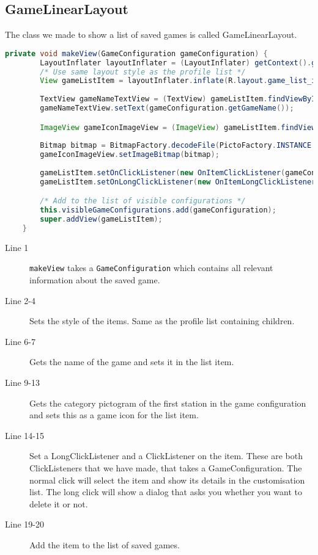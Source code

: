 \subsection*{GameLinearLayout}
The class we made to show a list of saved games is called GameLinearLayout.\\

\begin{lstlisting}[language=java,firstnumber=1,caption={The method to create a list item},label=lst:makeview]
private void makeView(GameConfiguration gameConfiguration) {
        LayoutInflater layoutInflater = (LayoutInflater) getContext().getSystemService(Context.LAYOUT_INFLATER_SERVICE);
        /* Use same layout style as the profile list */
        View gameListItem = layoutInflater.inflate(R.layout.game_list_item, null);
        
        TextView gameNameTextView = (TextView) gameListItem.findViewById(R.id.gameName);
        gameNameTextView.setText(gameConfiguration.getGameName());

        ImageView gameIconImageView = (ImageView) gameListItem.findViewById(R.id.gameIcon);
        
        Bitmap bitmap = BitmapFactory.decodeFile(PictoFactory.INSTANCE.getPictogram(super.getContext(),gameConfiguration.getStation(0).getCategory()).getImagePath());
        gameIconImageView.setImageBitmap(bitmap);
        
        gameListItem.setOnClickListener(new OnItemClickListener(gameConfiguration));
        gameListItem.setOnLongClickListener(new OnItemLongClickListener(gameConfiguration));

        /* Add to the list of visible configurations */
        this.visibleGameConfigurations.add(gameConfiguration);
        super.addView(gameListItem);
    }
\end{lstlisting}
\begin{description}
\item[Line 1] \lstinline|makeView| takes a \lstinline|GameConfiguration| which contains all relevant information about the saved game.
\item[Line 2-4] Sets the style of the items. Same as the profile list containing children.
\item[Line 6-7] Gets the name of the game and sets it in the list item.
\item[Line 9-13] Gets the category pictogram of the first station in the game configuration and sets this as a game icon for the list item.
\item[Line 14-15] Set a LongClickListener and a ClickListener on the item. These are both ClickListeners that we have made, that takes a GameConfiguration. The normal click will select the item and show its details in the customisation list. The long click will show a dialog that asks you whether you want to delete it or not. 
\item[Line 19-20] Add the item to the list of saved games.
\end{description}

